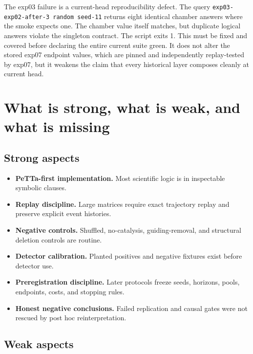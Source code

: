 \documentclass[11pt]{article}
\newcommand{\code}[1]{\texttt{#1}}
\begin{document}
The exp03 failure is a current-head reproducibility defect.  The query
\code{exp03-exp02-after-3 random seed-11} returns eight identical chamber
answers where the smoke expects one.  The chamber value itself matches, but
duplicate logical answers violate the singleton contract.  The script exits
1.  This must be fixed and covered before declaring the entire current suite
green.  It does not alter the stored exp07 endpoint values, which are pinned
and independently replay-tested by exp07, but it weakens the claim that every
historical layer composes cleanly at current head.

\section{What is strong, what is weak, and what is missing}

\subsection{Strong aspects}

\begin{itemize}
\item \textbf{PeTTa-first implementation.}  Most scientific logic is in
  inspectable symbolic clauses.
\item \textbf{Replay discipline.}  Large matrices require exact trajectory
  replay and preserve explicit event histories.
\item \textbf{Negative controls.}  Shuffled, no-catalysis, guiding-removal, and
  structural deletion controls are routine.
\item \textbf{Detector calibration.}  Planted positives and negative fixtures
  exist before detector use.
\item \textbf{Preregistration discipline.}  Later protocols freeze seeds,
  horizons, pools, endpoints, costs, and stopping rules.
\item \textbf{Honest negative conclusions.}  Failed replication and causal
  gates were not rescued by post hoc reinterpretation.
\end{itemize}

\subsection{Weak aspects}
\end{document}
